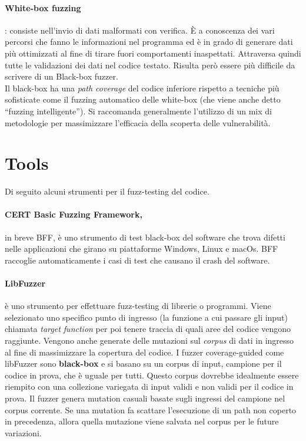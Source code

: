 \paragraph{White-box fuzzing}: consiste nell'invio di dati malformati con verifica.
È a conoscenza dei vari percorsi che fanno le informazioni nel programma ed è in grado di generare dati più ottimizzati al fine di tirare fuori comportamenti inaspettati.
Attraversa quindi tutte le validazioni dei dati nel codice testato.
Risulta però essere più difficile da scrivere di un Black-box fuzzer.\\

Il black-box ha una \textit{path coverage} del codice inferiore rispetto a tecniche più sofisticate come il fuzzing automatico delle white-box (che viene anche detto ``fuzzing intelligente'').
Si raccomanda generalmente l'utilizzo di un mix di metodologie per massimizzare l'efficacia della scoperta delle vulnerabilità.

\section{Tools}

Di seguito alcuni strumenti per il fuzz-testing del codice.

\paragraph{CERT Basic Fuzzing Framework,} in breve BFF, è uno strumento di test black-box del software che trova difetti nelle applicazioni che girano su piattaforme Windows, Linux e macOs. BFF raccoglie automaticamente i casi di test che causano il crash del software.

\paragraph{LibFuzzer} è uno strumento per effettuare fuzz-testing di librerie o programmi. Viene selezionato uno specifico punto di ingresso (la funzione a cui passare gli input) chiamata \textit{target function} per poi tenere traccia di quali aree del codice vengono raggiunte. Vengono anche generate delle mutazioni sul \textit{corpus} di dati in ingresso al fine di massimizzare la copertura del codice. I fuzzer coverage-guided come libFuzzer sono \textbf{black-box} e si basano su un corpus di input, campione per il codice in prova, che è uguale per tutti. Questo corpus dovrebbe idealmente essere riempito con una collezione variegata di input validi e non validi per il codice in prova. Il fuzzer genera mutation casuali basate sugli ingressi del campione nel corpus corrente. Se una mutation fa scattare l'esecuzione di un path non coperto in precedenza, allora quella mutazione viene salvata nel corpus per le future variazioni.

